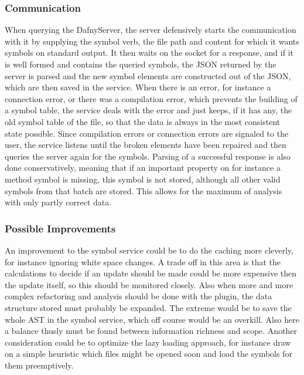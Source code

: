 \subsubsection{Communication}
When querying the DafnyServer, the server defensively starts the communication with it by supplying the symbol verb, the file path and content for which it wants symbols on standard output. It then waits on the socket for a response, and if it is well formed and contains the queried symbols, the JSON returned by the server is parsed and the new symbol elements are constructed out of the JSON, which are then saved in the service. \newline
When there is an error, for instance a connection error, or there was a compilation error, which prevents the building of a symbol table, the service deals with the error and just keeps, if it has any, the old symbol table of the file, so that the data is always in the most consistent state possible. Since compilation errors or connection errors are signaled to the user, the service listens until the broken elements have been repaired and then queries the server again for the symbols. \newline
Parsing of a successful response is also done conservatively, meaning that if an important property on for instance a method symbol is missing, this symbol is not stored, although all other valid symbols from that batch are stored. This allows for the maximum of analysis with only partly correct data.
\subsubsection{Possible Improvements}
An improvement to the symbol service could be to do the caching more cleverly, for instance ignoring white space changes. A trade off in this area is that the calculations to decide if an update should be made could be more expensive then the update itself, so this should be monitored closely. Also when more and more complex refactoring and analysis should be done with the plugin, the data structure stored must probably be expanded. The extreme would be to save the whole AST in the symbol service, which off course would be an overkill. Also here a balance thusly must be found between information richness and scope. Another consideration could be to optimize the lazy loading approach, for instance draw on a simple heuristic which files might be opened soon and load the symbols for them preemptively.\newline

